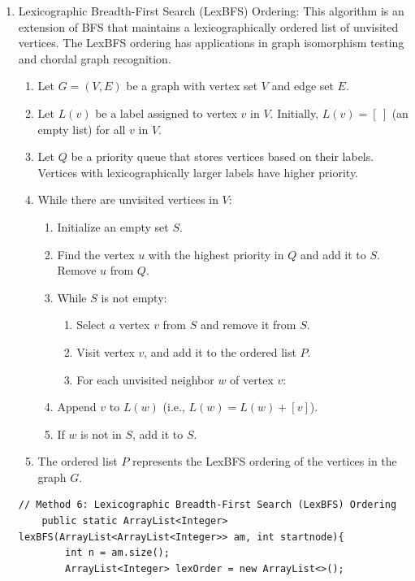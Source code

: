 \documentclass{article}
\begin{document}
\begin{enumerate}
\item Lexicographic Breadth-First Search (LexBFS) Ordering: This algorithm is an extension of BFS that maintains a lexicographically ordered list of unvisited vertices. The LexBFS ordering has applications in graph isomorphism testing and chordal graph recognition.\cite{Brandstadt}
\begin{enumerate}
    \item Let $G = (V, E)$ be a graph with vertex set $V$ and edge set $E$.
    \item Let $L(v)$ be a label assigned to vertex $v$ in $V$. Initially, $L(v) = [ \ ]$ (an empty list) for all $v$ in $V$.
    \item Let $Q$ be a priority queue that stores vertices based on their labels. Vertices with lexicographically larger labels have higher priority.
    \item While there are unvisited vertices in $V$:
    \begin{enumerate}
        \item Initialize an empty set $S$.
        \item Find the vertex $u$ with the highest priority in $Q$ and add it to $S$. Remove $u$ from $Q$.
        \item While $S$ is not empty:
        \begin{enumerate}
            \item Select $a$ vertex $v$ from $S$ and remove it from $S$.
            \item Visit vertex $v$, and add it to the ordered list $P$.
            \item For each unvisited neighbor $w$ of vertex $v$:
        \end{enumerate}
        \item Append $v$ to $L(w)$ (i.e., $L(w) = L(w) + [v]$).
        \item If $w$ is not in $S$, add it to $S$.
    \end{enumerate}
    \item The ordered list $P$ represents the LexBFS ordering of the vertices in the graph $G$.


\end{enumerate}

    \begin{verbatim}
// Method 6: Lexicographic Breadth-First Search (LexBFS) Ordering
    public static ArrayList<Integer> lexBFS(ArrayList<ArrayList<Integer>> am, int startnode){
        int n = am.size();
        ArrayList<Integer> lexOrder = new ArrayList<>();



\end{verbatim}
\end{enumerate}
\end{document}
